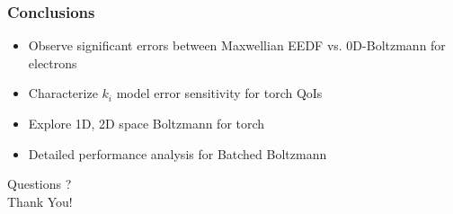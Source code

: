 \documentclass[mathserif, aspectratio=169]{beamer}
\begin{document}
\begin{frame}
	\frametitle{Conclusions}
	\begin{itemize}
		\item Observe significant errors between Maxwellian EEDF vs. 0D-Boltzmann for electrons %
		\item Characterize $k_i$ model error sensitivity for torch QoIs
		\item Explore 1D, 2D space Boltzmann for torch 
		\item Detailed performance analysis for Batched Boltzmann
	\end{itemize}
	\pause
	\begin{center}
		Questions ? \\
		Thank You!
	\end{center}
\end{frame}
\end{document}
